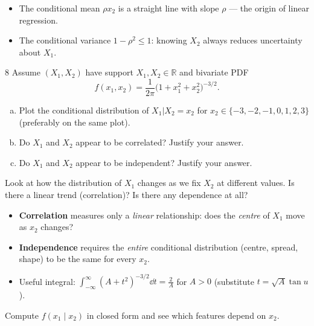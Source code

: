 \documentclass[11pt]{article}
\begin{document}
\begin{takeaway}
\begin{itemize}
\item The conditional mean $\rho x_2$ is a straight line with slope $\rho$ --- the origin of linear regression.
\item The conditional variance $1-\rho^2\le1$: knowing $X_2$ always reduces uncertainty about $X_1$.
\end{itemize}
\end{takeaway}


\begin{problem}{8}
Assume $(X_1,X_2)$ have support $X_1,X_2\in\mathbb R$ and bivariate PDF
\[
f(x_1,x_2)=\frac{1}{2\pi}\big(1+x_1^2+x_2^2\big)^{-3/2}.
\]
\begin{enumerate}[(a)]
\item Plot the conditional distribution of $X_1|X_2=x_2$ for $x_2\in\{-3,-2,-1,0,1,2,3\}$ (preferably on the same plot).
\item Do $X_1$ and $X_2$ appear to be correlated? Justify your answer.
\item Do $X_1$ and $X_2$ appear to be independent? Justify your answer.
\end{enumerate}
\end{problem}

\begin{restate}
Look at how the distribution of $X_1$ changes as we fix $X_2$ at different values. Is there a linear trend (correlation)? Is there any dependence at all?
\end{restate}

\begin{recall}
\begin{itemize}
\item \textbf{Correlation} measures only a \emph{linear} relationship: does the \emph{centre} of $X_1$ move as $x_2$ changes?
\item \textbf{Independence} requires the \emph{entire} conditional distribution (centre, spread, shape) to be the same for every $x_2$.
\item Useful integral: $\displaystyle\int_{-\infty}^\infty(A+t^2)^{-3/2}\dd t=\frac{2}{A}$ for $A>0$ (substitute $t=\sqrt A\tan u$).
\end{itemize}
\end{recall}

\begin{keyidea}
Compute $f(x_1\mid x_2)$ in closed form and see which features depend on $x_2$.
\end{keyidea}
\end{document}

